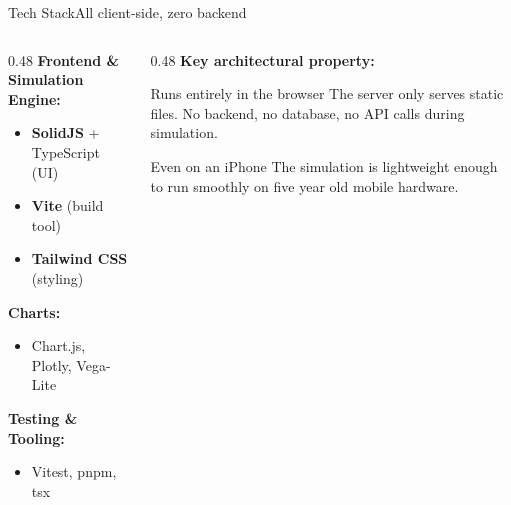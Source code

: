 \begin{frame}[t]{Tech Stack}{All client-side, zero backend}

  \begin{columns}[T]
    \begin{column}{0.48\textwidth}
      \textbf{Frontend \& Simulation Engine:}
      \begin{itemize}
        \item \textbf{SolidJS} + TypeScript (UI)
        \item \textbf{Vite} (build tool)
        \item \textbf{Tailwind CSS} (styling)
      \end{itemize}

      \vspace{0.3cm}
      \textbf{Charts:}
      \begin{itemize}
        \item Chart.js, Plotly, Vega{-}Lite
      \end{itemize}

      \vspace{0.3cm}
      \textbf{Testing \& Tooling:}
      \begin{itemize}
        \item Vitest, pnpm, tsx
      \end{itemize}
    \end{column}

    \begin{column}{0.48\textwidth}
      \textbf{Key architectural property:}

      \vspace{0.2cm}
      \begin{block}{Runs entirely in the browser}
        The server only serves static files.
        No backend, no database, no API calls
        during simulation.
      \end{block}

      \vspace{0.2cm}
      \begin{exampleblock}{Even on an iPhone}
        The simulation is lightweight enough to
        run smoothly on five year old mobile hardware.
      \end{exampleblock}
    \end{column}
  \end{columns}

\end{frame}
